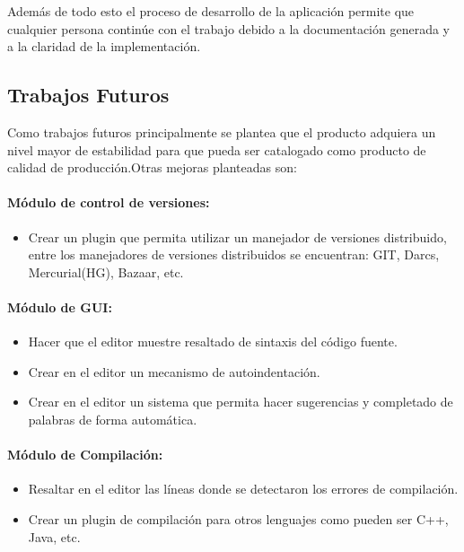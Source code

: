 Además de todo esto el proceso de desarrollo de la aplicación permite que cualquier persona continúe con el trabajo debido a la documentación generada y a la claridad de la implementación.


\subsection{Trabajos Futuros}

Como trabajos futuros principalmente se plantea que el producto adquiera un nivel mayor de estabilidad para que pueda ser catalogado como producto de calidad de producción.\newline Otras mejoras planteadas son:

\paragraph{Módulo de control de versiones:}

\begin{itemize}
	\item Crear un plugin que permita utilizar un manejador de versiones distribuido, entre los manejadores de versiones distribuidos se encuentran: GIT, Darcs, Mercurial(HG), Bazaar, etc.
\end{itemize}

\paragraph{Módulo de GUI:}

\begin{itemize}
	\item Hacer que el editor muestre resaltado de sintaxis del código fuente.
	\item Crear en el editor un mecanismo de autoindentación.
	\item Crear en el editor un sistema que permita hacer sugerencias y completado de palabras de forma automática.
\end{itemize}

\paragraph{Módulo de Compilación:}

\begin{itemize}
	\item Resaltar en el editor las líneas donde se detectaron los errores de compilación.
	\item Crear un plugin de compilación para otros lenguajes como pueden ser C++, Java, etc.
\end{itemize}

